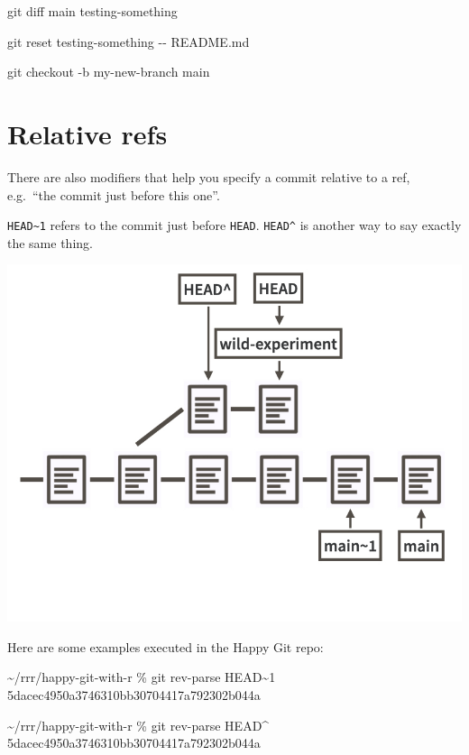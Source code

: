 \documentclass[
]{book}
\newenvironment{Shaded}{\begin{snugshade}}{\end{snugshade}}
\newcommand{\NormalTok}[1]{#1}
\begin{document}
\begin{Shaded}
\begin{Highlighting}[]
\NormalTok{git diff main testing{-}something}

\NormalTok{git reset testing{-}something {-}{-} README.md}

\NormalTok{git checkout {-}b my{-}new{-}branch main}
\end{Highlighting}
\end{Shaded}

\section{Relative refs}\label{relative-refs}

There are also modifiers that help you specify a commit relative to a ref, e.g.~``the commit just before this one''.

\texttt{HEAD\textasciitilde{}1} refers to the commit just before \texttt{HEAD}.
\texttt{HEAD\^{}} is another way to say exactly the same thing.

\begin{center}\includegraphics[width=0.6\linewidth]{img/refs-relative} \end{center}

Here are some examples executed in the Happy Git repo:

\begin{Shaded}
\begin{Highlighting}[]
\NormalTok{\textasciitilde{}/rrr/happy{-}git{-}with{-}r \% git rev{-}parse HEAD\textasciitilde{}1}
\NormalTok{5dacec4950a3746310bb30704417a792302b044a}

\NormalTok{\textasciitilde{}/rrr/happy{-}git{-}with{-}r \% git rev{-}parse HEAD\^{}}
\NormalTok{5dacec4950a3746310bb30704417a792302b044a}
\end{Highlighting}
\end{Shaded}
\end{document}
